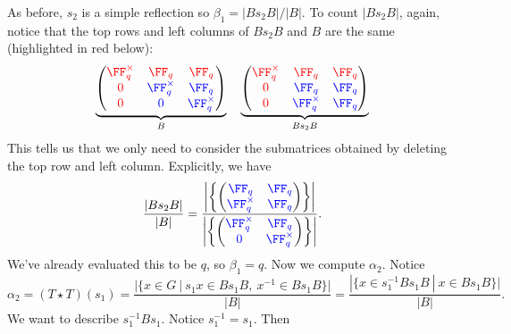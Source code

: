 \documentclass[11pt]{amsart}
\theoremstyle{remark}
\begin{document}
As before, $s_2$ is a simple reflection so $\beta_1 = |Bs_2B|/|B|$.
To count $|Bs_2B|$, again, notice that the top rows and left columns of $Bs_2B$ and $B$ are the same (highlighted in {\color{red} red} below):
\[
	\underbrace{\begin{pmatrix}
			\color{red}\FF_q^\times & \color{red}\FF_q         & \color{red}\FF_q         \\
			\color{red}0            & \color{blue}\FF_q^\times & \color{blue}\FF_q        \\
			\color{red}0            & \color{blue}0            & \color{blue}\FF_q^\times
		\end{pmatrix}}_{B}\quad \underbrace{\begin{pmatrix}
			\color{red}\FF_q^\times & \color{red}\FF_q         & \color{red}\FF_q  \\
			\color{red}0            & \color{blue}\FF_q        & \color{blue}\FF_q \\
			\color{red}0            & \color{blue}\FF_q^\times & \color{blue}\FF_q
		\end{pmatrix}}_{Bs_2B}
\]
This tells us that we only need to consider the submatrices obtained by deleting the top row and left column.
Explicitly, we have
\[
	\frac{|Bs_2B|}{|B|} = \frac{\left|\left\{\begin{pmatrix} \color{blue}\FF_q & \color{blue}\FF_q \\ \color{blue}\FF_q^\times & \color{blue}\FF_q \end{pmatrix}\right\}\right|}{\left|\left\{\begin{pmatrix} \color{blue}\FF_q^\times & \color{blue}\FF_q \\ \color{blue}0 & \color{blue}\FF_q^\times \end{pmatrix}\right\}\right|}.
\]
We've already evaluated this to be $q$, so $\beta_1 = q$.
Now we compute $\alpha_2$.
Notice
\[
	\alpha_2 = (T\star T)(s_1) = \frac{|\{x\in G\ |\ s_1x\in Bs_1B,\ x^{-1}\in Bs_1B\}|}{|B|} = \frac{|\{x\in s_1^{-1}Bs_1B\ |\ x\in Bs_1B\}|}{|B|}.
\]
We want to describe $s_1^{-1}Bs_1$.
Notice $s_1^{-1}=s_1$.
Then
\end{document}
